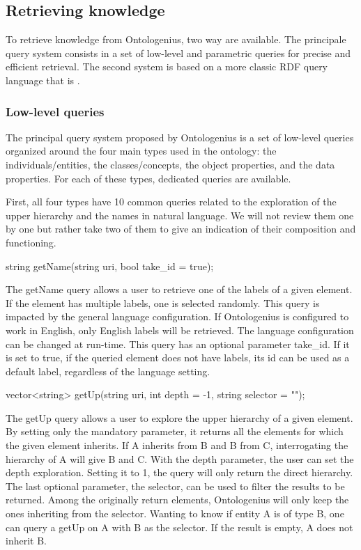 \subsection{Retrieving knowledge}

To retrieve knowledge from Ontologenius, two way are available. The principale query system consists in a set of low-level and parametric queries for precise and efficient retrieval. The second system is based on a more classic RDF query language that is \sparql{}.

\subsubsection{Low-level queries}

The principal query system proposed by Ontologenius is a set of low-level queries organized around the four main types used in the ontology: the individuals/entities, the classes/concepts, the object properties, and the data properties. For each of these types, dedicated queries are available.

First, all four types have 10 common queries related to the exploration of the upper hierarchy and the names in natural language. We will not review them one by one but rather take two of them to give an indication of their composition and functioning. 

\begin{verbatimtab}
string getName(string uri, 
               bool take_id = true);
\end{verbatimtab}

The getName query allows a user to retrieve one of the labels of a given element. If the element has multiple labels, one is selected randomly. This query is impacted by the general language configuration. If Ontologenius is configured to work in English, only English labels will be retrieved. The language configuration can be changed at run-time. This query has an optional parameter take\_id. If it is set to true, if the queried element does not have labels, its id can be used as a default label, regardless of the language setting. 

\begin{verbatimtab}
vector<string> getUp(string uri,
                     int depth = -1, 
                     string selector = "");
\end{verbatimtab}

The getUp query allows a user to explore the upper hierarchy of a given element. By setting only the mandatory parameter, it returns all the elements for which the given element inherits. If A inherits from B and B from C, interrogating the hierarchy of A will give B and C. With the depth parameter, the user can set the depth exploration. Setting it to 1, the query will only return the direct hierarchy. The last optional parameter, the selector, can be used to filter the results to be returned. Among the originally return elements, Ontologenius will only keep the ones inheriting from the selector. Wanting to know if entity A is of type B, one can query a getUp on A with B as the selector. If the result is empty, A does not inherit B.

